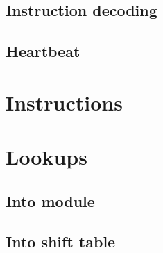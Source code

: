\subsection{Instruction decoding}            \label{rlp utils: constraints: instruction decoding}     
\subsection{Heartbeat}                       \label{rlp utils: constraints: heartbeat}                

\section{Instructions}                       \label{rlp utils: instructions}                          

\section{Lookups}                            \label{rlp utils: lookups}
\subsection{Into \wcpMod{} module}           \label{rlp utils: lookups: rlp utils into wcp}           
\subsection{Into shift table}                \label{rlp utils: lookups: rlp utils into shf table}     
